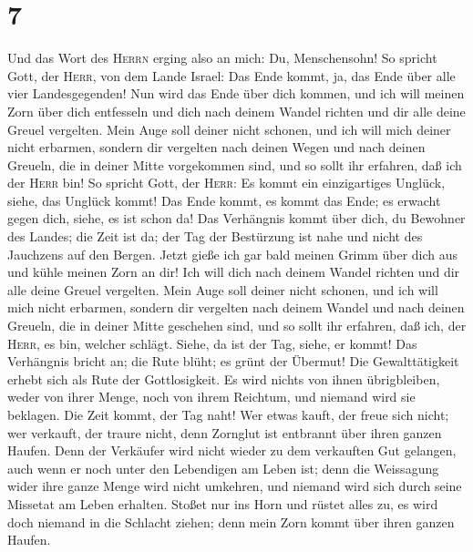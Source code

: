 \hypertarget{section-6}{%
\section{7}\label{section-6}}

 Und das Wort des \textsc{Herrn} erging also an mich:
 Du, Menschensohn! So spricht Gott, der \textsc{Herr}, von
dem Lande Israel: Das Ende kommt, ja, das Ende über alle vier
Landesgegenden!  Nun wird das Ende über dich kommen, und
ich will meinen Zorn über dich entfesseln und dich nach deinem Wandel
richten und dir alle deine Greuel vergelten.  Mein Auge
soll deiner nicht schonen, und ich will mich deiner nicht erbarmen,
sondern dir vergelten nach deinen Wegen und nach deinen Greueln, die in
deiner Mitte vorgekommen sind, und so sollt ihr erfahren, daß ich der
\textsc{Herr} bin!  So spricht Gott, der \textsc{Herr}: Es
kommt ein einzigartiges Unglück, siehe, das Unglück kommt!
 Das Ende kommt, es kommt das Ende; es erwacht gegen dich,
siehe, es ist schon da!  Das Verhängnis kommt über dich,
du Bewohner des Landes; die Zeit ist da; der Tag der Bestürzung ist nahe
und nicht des Jauchzens auf den Bergen.  Jetzt gieße ich
gar bald meinen Grimm über dich aus und kühle meinen Zorn an dir! Ich
will dich nach deinem Wandel richten und dir alle deine Greuel
vergelten.  Mein Auge soll deiner nicht schonen, und ich
will mich nicht erbarmen, sondern dir vergelten nach deinem Wandel und
nach deinen Greueln, die in deiner Mitte geschehen sind, und so sollt
ihr erfahren, daß ich, der \textsc{Herr}, es bin, welcher schlägt.
 Siehe, da ist der Tag, siehe, er kommt! Das Verhängnis
bricht an; die Rute blüht; es grünt der Übermut!  Die
Gewalttätigkeit erhebt sich als Rute der Gottlosigkeit. Es wird nichts
von ihnen übrigbleiben, weder von ihrer Menge, noch von ihrem Reichtum,
und niemand wird sie beklagen.  Die Zeit kommt, der Tag
naht! Wer etwas kauft, der freue sich nicht; wer verkauft, der traure
nicht, denn Zornglut ist entbrannt über ihren ganzen Haufen.
 Denn der Verkäufer wird nicht wieder zu dem verkauften
Gut gelangen, auch wenn er noch unter den Lebendigen am Leben ist; denn
die Weissagung wider ihre ganze Menge wird nicht umkehren, und niemand
wird sich durch seine Missetat am Leben erhalten.  Stoßet
nur ins Horn und rüstet alles zu, es wird doch niemand in die Schlacht
ziehen; denn mein Zorn kommt über ihren ganzen Haufen. 
